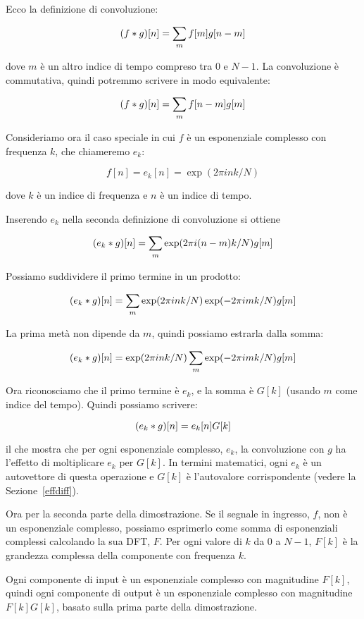 \documentclass[12pt]{book} \usepackage[width=5.5in,height=8.5in, hmarginratio=3:2,vmarginratio=1:1]{geometry}
\begin{document}
%
Ecco la definizione di convoluzione:

%
\[ (f \ast g)[n] = \sum_m f[m] g[n-m] \] 

%
dove $m$ è un altro indice di tempo compreso tra 0 e $N-1$. La convoluzione è commutativa, quindi potremmo scrivere in modo equivalente:

%
\[ (f \ast g)[n] = \sum_m f[n-m] g[m] \] 

%
Consideriamo ora il caso speciale in cui $f$ è un esponenziale complesso con frequenza $k$, che chiameremo $e_k$:

%
\[ f[n] = e_k[n] = \exp(2 \pi i n k / N) \] 

%
dove $k$ è un indice di frequenza e $n$ è un indice di tempo.

Inserendo $e_k$ nella seconda definizione di convoluzione si ottiene

%
\[ (e_k \ast g)[n] = \sum_m \exp(2 \pi i (n-m) k / N) g[m] \] 

%
Possiamo suddividere il primo termine in un prodotto:

%
\[ (e_k \ast g)[n] = \sum_m \exp(2 \pi i n k / N) \exp(-2 \pi i m k / N) g[m] \] 

%
La prima metà non dipende da $m$, quindi possiamo estrarla dalla somma:

%
\[ (e_k \ast g)[n] = \exp(2 \pi i n k / N) \sum_m \exp(-2 \pi i m k / N) g[m] \] 

%
Ora riconosciamo che il primo termine è $e_k$, e la somma è $G[k]$ (usando $m$ come indice del tempo). Quindi possiamo scrivere:

%
\[ (e_k \ast g)[n] = e_k[n] G[k] \] 

%
il che mostra che per ogni esponenziale complesso, $e_k$, la convoluzione con $g$ ha l'effetto di moltiplicare $e_k$ per $G[k]$. In termini matematici, ogni $e_k$ è un autovettore di questa operazione e $G[k]$ è l'autovalore corrispondente (vedere la Sezione~\ref{effdiff}).

Ora per la seconda parte della dimostrazione. Se il segnale in ingresso, $f$, non è un esponenziale complesso, possiamo esprimerlo come somma di esponenziali complessi calcolando la sua DFT, $F$. Per ogni valore di $k$ da 0 a $N-1$, $F[k]$ è la grandezza complessa della componente con frequenza $k$.

Ogni componente di input è un esponenziale complesso con magnitudine $F[k]$, quindi ogni componente di output è un esponenziale complesso con magnitudine $F[k] G[k]$, basato sulla prima parte della dimostrazione.
\end{document}
